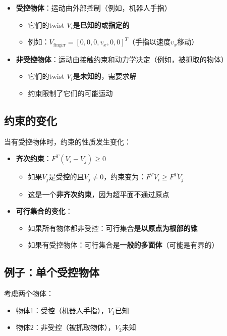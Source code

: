 \documentclass[12pt,a4paper]{article}
\begin{document}
\begin{itemize}
\item \textbf{受控物体}：运动由外部控制（例如，机器人手指）
  \begin{itemize}
  \item 它们的twist $V_i$是\textbf{已知的}或\textbf{指定的}
  \item 例如：$V_{\text{finger}} = [0, 0, 0, v_x, 0, 0]^T$（手指以速度$v_x$移动）
  \end{itemize}

\item \textbf{非受控物体}：运动由接触约束和动力学决定（例如，被抓取的物体）
  \begin{itemize}
  \item 它们的twist $V_i$是\textbf{未知的}，需要求解
  \item 约束限制了它们的可能运动
  \end{itemize}
\end{itemize}

\subsection{约束的变化}

当有受控物体时，约束的性质发生变化：

\begin{itemize}
\item \textbf{齐次约束}：$F^T (V_i - V_j) \geq 0$
  \begin{itemize}
  \item 如果$V_j$是受控的且$V_j \neq 0$，约束变为：$F^T V_i \geq F^T V_j$
  \item 这是一个\textbf{非齐次约束}，因为超平面不通过原点
  \end{itemize}

\item \textbf{可行集合的变化}：
  \begin{itemize}
  \item 如果所有物体都非受控：可行集合是\textbf{以原点为根部的锥}
  \item 如果有受控物体：可行集合是\textbf{一般的多面体}（可能是有界的）
  \end{itemize}
\end{itemize}

\subsection{例子：单个受控物体}

考虑两个物体：
\begin{itemize}
\item 物体1：受控（机器人手指），$V_1$已知
\item 物体2：非受控（被抓取物体），$V_2$未知
\end{itemize}
\end{document}
